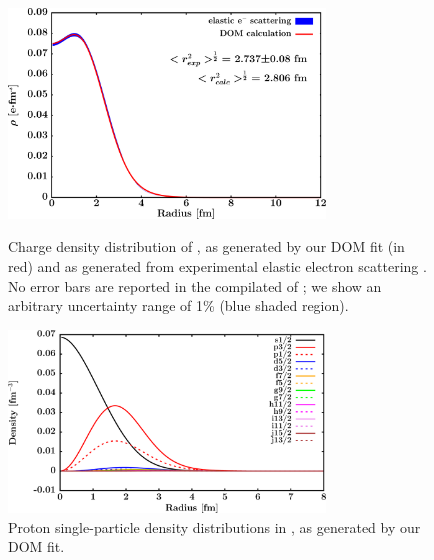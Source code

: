 \begin{figure}[tb]
    \centering
    \includegraphics[width=0.75\textwidth]{figures/o16_chargeDensity.png}
    \caption[Proton single-particle density distributions in \oSix]
    {
        Charge density distribution of \oSix, as generated
        by our DOM fit (in red) and as generated from experimental
        elastic electron scattering \cite{DeVries1987}. No error bars are
        reported in the compilated of \cite{DeVries1987}; we show an
        arbitrary uncertainty range of 1\% (blue shaded region).
    }
    \label{o16ChargeDensity}
    \vspace{16pt}
    \includegraphics[width=0.75\textwidth]{figures/o16_protonLJDensityDist.png}
    \caption[Proton single-particle density distributions in \oSix]
    {
        Proton single-particle density distributions in \oSix, as generated
        by our DOM fit.
    }
    \label{o16LJDensityDist}
\end{figure}

%

